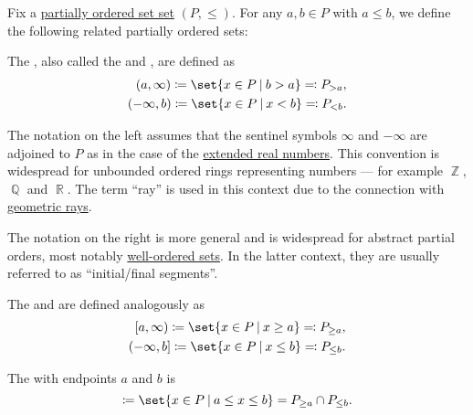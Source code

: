 \begin{definition}\label{def:partially_ordered_set_interval}
  Fix a \hyperref[def:partially_ordered_set]{partially ordered set set} \( (P, \leq) \). For any \( a, b \in P \) with \( a \leq b \), we define the following related partially ordered sets:

  \begin{thmenum}
     The , also called the  and , are defined as
    \begin{equation*}
      \begin{aligned}
        (a, \infty) \coloneqq \set{ x \in P \given b > a } \eqqcolon P_{>a},
        \\
        (-\infty, b) \coloneqq \set{ x \in P \given x < b } \eqqcolon P_{<b}.
      \end{aligned}
    \end{equation*}

    The notation on the left assumes that the sentinel symbols \( \infty \) and \( -\infty \) are adjoined to \( P \) as in the case of the \hyperref[def:extended_real_numbers]{extended real numbers}. This convention is widespread for unbounded ordered rings representing numbers --- for example \hyperref[def:integers]{\( \BbbZ \)}, \hyperref[def:rational_numbers]{\( \BbbQ \)} and \hyperref[def:real_numbers]{\( \BbbR \)}. The term \enquote{ray} is used in this context due to the connection with \hyperref[def:geometric_ray]{geometric rays}.

    The notation on the right is more general and is widespread for abstract partial orders, most notably \hyperref[def:well_ordered_set]{well-ordered sets}. In the latter context, they are usually referred to as \enquote{initial/final segments}.

    The  and  are defined analogously as
    \begin{equation*}
      \begin{aligned}
        [a, \infty) \coloneqq \set{ x \in P \given x \geq a } \eqqcolon P_{\geq a},
        \\
        (-\infty, b] \coloneqq \set{ x \in P \given x \leq b } \eqqcolon P_{\leq b}.
      \end{aligned}
    \end{equation*}

     The  with endpoints \( a \) and \( b \) is
    \begin{equation*}
      [a, b] \coloneqq \set{ x \in P \given a \leq x \leq b } = P_{\geq a} \cap P_{\leq b}.
    \end{equation*}


\end{thmenum}
\end{definition}
